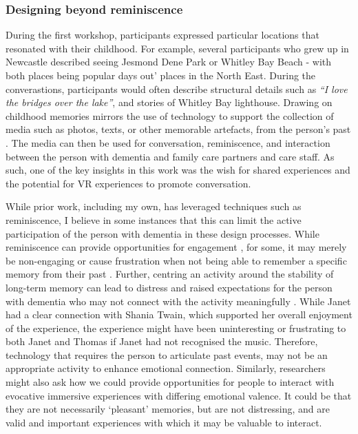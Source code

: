 \subsubsection{Designing beyond reminiscence}
\label{ReminiscencevsMoment}
During the first workshop, participants expressed particular locations that resonated with their childhood. For example, several participants who grew up in Newcastle described seeing Jesmond Dene Park or Whitley Bay Beach - with both places being popular days out' places in the North East. During the converastions, participants would often describe structural details such as \textit{``I love the bridges over the lake''}, and stories of Whitley Bay lighthouse. Drawing on childhood memories mirrors the use of technology to support the collection of media such as photos, texts, or other memorable artefacts, from the person's past \citep{astell_stimulating_2010}. The media can then be used for conversation, reminiscence, and interaction between the person with dementia and family care partners and care staff. As such, one of the key insights in this work was the wish for shared experiences and the potential for VR experiences to promote conversation. 

While prior work, including my own, has leveraged techniques such as reminiscence, I believe in some instances that this can limit the active participation of the person with dementia in these design processes. While reminiscence can provide opportunities for engagement \citep{gowans_designing_2004, yasuda_effectiveness_2009}, for some, it may merely be non-engaging or cause frustration when not being able to remember a specific memory from their past \citep{lazar_critical_2017}. Further, centring an activity around the stability of long-term memory can lead to distress and raised expectations for the person with dementia who may not connect with the activity meaningfully \citep{alm_communication_2007}. While Janet had a clear connection with Shania Twain, which supported her overall enjoyment of the experience, the experience might have been uninteresting or frustrating to both Janet and Thomas if Janet had not recognised the music. Therefore, technology that requires the person to articulate past events, may not be an appropriate activity to enhance emotional connection. Similarly, researchers might also ask how we could provide opportunities for people to interact with evocative immersive experiences with differing emotional valence. It could be that they are not necessarily ‘pleasant’ memories, but are not distressing, and are valid and important experiences with which it may be valuable to interact.

